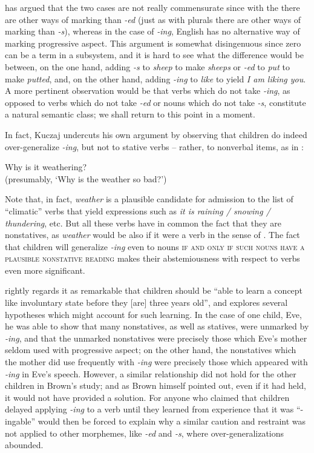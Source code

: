 \citet{Kuczaj1978} has argued that the two cases are not really commensurate since with the  there are other ways of mark\-ing than \textit{-ed} (just as with plurals there are other ways of marking than \textit{-s}), whereas in the case of \textit{-ing}, English has no alternative way of marking progressive aspect. This argument is somewhat disingenuous since zero can be a term in a subsystem, and it is hard to see what the difference would be between, on the one hand, adding \textit{-s} to \textit{sheep} to make \textit{sheeps} or \textit{-ed} to \textit{put} to make \textit{putted}, and, on the other hand, adding \textit{-ing} to \textit{like} to yield \textit{I am liking you}. A more pertinent observa\-tion would be that verbs which do not take \textit{-ing}, as opposed to verbs which do not take \textit{-ed} or nouns which do not take \textit{-s}, constitute a natural semantic class; we shall return to this point in a moment.

In fact, Kuczaj undercuts his own argument by observing that children do indeed over-generalize \textit{-ing}, but not to stative verbs -- rather, to nonverbal items, as in :

\ea\label{ex:3:15}
 Why is it weathering?\\
\glt (presumably, `Why is the weather so bad?')
\z

\largerpage 
\noindent Note that, in fact, \textit{weather} is a plausible candidate for admission to the list of ``climatic'' verbs that yield expressions such as \textit{it is raining / snowing / thundering}, etc. But all these verbs have in common the fact that they are nonstatives, as \textit{weather} would be also if it were a verb in the sense of . The fact that children will generalize \textit{-ing} even to nouns \textsc{if and only if such nouns have a plausible nonstative reading} makes their abstemiousness with respect to  verbs even more significant.

\largerpage
\citet[326ff]{Brown1973} rightly regards it as remarkable that chil\-dren should be ``able to learn a concept like involuntary state before they [are] three years old'', and explores several hypotheses which might account for such learning. In the case of one child, Eve, he was able to show that many nonstatives, as well as statives, were unmarked by \textit{-ing}, and that the unmarked nonstatives were precisely those which Eve's mother seldom used with progressive aspect; on the other hand, the nonstatives which the mother did use frequently with \textit{-ing} were precisely those which appeared with \textit{-ing} in Eve's speech. However, a similar relationship did not hold for the other children in Brown's study; and as Brown himself pointed out, even if it had held, it would not have provided a solution. For anyone who claimed that children delayed applying \textit{-ing} to a verb until they learned from experience that it was ``-ingable'' would then be forced to explain why a similar caution and restraint was not applied to other morphemes, like \textit{-ed} and \textit{-s}, where over-generalizations abounded.

